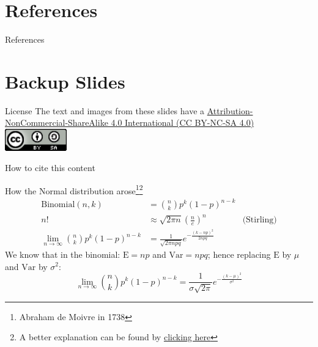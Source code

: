 \documentclass[aspectratio=169]{beamer}                    %
\begin{document}

\begingroup
\AtBeginSection[]{}
\section{References}
\begin{frame}[allowframebreaks]{References}
	\printbibliography
\end{frame}
\endgroup

\appendix %
\section*{Backup Slides}
\begin{frame}{License}
	\centering
	\vfill
	\Large The text and images from these slides have a
	\href{https://creativecommons.org/licenses/by-nc-sa/4.0/deed.en}{Attribution-NonCommercial-ShareAlike 4.0 International (CC BY-NC-SA 4.0)}
	\vfill
	\includegraphics[width = 0.2\textwidth]{CC_SA.png}
\end{frame}

\begin{frame}{How to cite this content}
	\centering
	\vfill
	\Large {}
	\vfill
\end{frame}

\begin{frame}[plain, noframenumbering, label=appendixnormal]{How the Normal distribution arose\footnote{Abraham de Moivre in 1738}\footnote{A better explanation can be found by \href{http://www.stat.yale.edu/~pollard/Courses/241.fall2014/notes2014/Bin.Normal.pdf}{clicking here}}}
	$$
		\begin{aligned}
			\text{Binomial}(n, k)                            & = \binom{n}{k} p^k (1-p)^{n-k}                                                \\
			n!                                               & \approx \sqrt{2 \pi n} \left(\frac{n}{e}\right)^n         & \text{(Stirling)} \\
			\lim_{n \to \infty} \binom{n}{k} p^k (1-p)^{n-k} & = \frac{1}{\sqrt{2 \pi npq}} e^{-\frac{(k - np)^2}{2npq}}
		\end{aligned}
	$$
	We know that in the binomial: $\mathrm{E} = np$ and $\mathrm{Var} = npq$; hence replacing $\mathrm{E}$ by $\mu$ and $\mathrm{Var}$ by $\sigma^2$:
	$$\lim_{n \to \infty} \binom{n}{k} p^k (1-p)^{n-k} = \frac{1}{\sigma \sqrt{2 \pi}} e^{-\frac{(k - \mu)^2}{\sigma^2}}$$
\end{frame}
\end{document}
